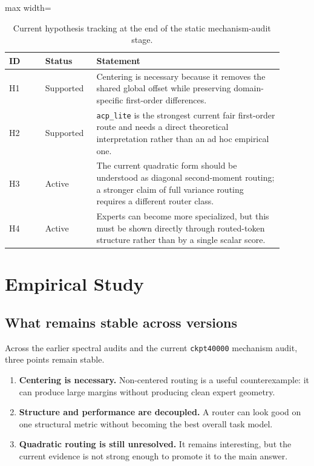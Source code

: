 \documentclass[11pt]{article}
\newcommand{\tablesize}{\footnotesize}
\begin{document}
\begin{table}[H]
\centering
\tablesize
\begin{adjustbox}{max width=\linewidth}
\begin{tabular}{p{0.12\linewidth}p{0.16\linewidth}p{0.62\linewidth}}
\toprule
ID & Status & Statement \\
\midrule
H1 & Supported & Centering is necessary because it removes the shared global offset while preserving domain-specific first-order differences. \\
H2 & Supported & \texttt{acp\_lite} is the strongest current fair first-order route and needs a direct theoretical interpretation rather than an ad hoc empirical one. \\
H3 & Active & The current quadratic form should be understood as diagonal second-moment routing; a stronger claim of full variance routing requires a different router class. \\
H4 & Active & Experts can become more specialized, but this must be shown directly through routed-token structure rather than by a single scalar score. \\
\bottomrule
\end{tabular}
\end{adjustbox}
\caption{Current hypothesis tracking at the end of the static mechanism-audit stage.}
\label{tab:hypothesis-status}
\end{table}

\section{Empirical Study}

\subsection{What remains stable across versions}

Across the earlier spectral audits and the current \texttt{ckpt40000} mechanism audit, three points remain stable.

\begin{enumerate}
    \item \textbf{Centering is necessary.} Non-centered routing is a useful counterexample: it can produce large margins without producing clean expert geometry.
    \item \textbf{Structure and performance are decoupled.} A router can look good on one structural metric without becoming the best overall task model.
    \item \textbf{Quadratic routing is still unresolved.} It remains interesting, but the current evidence is not strong enough to promote it to the main answer.
\end{enumerate}
\end{document}
